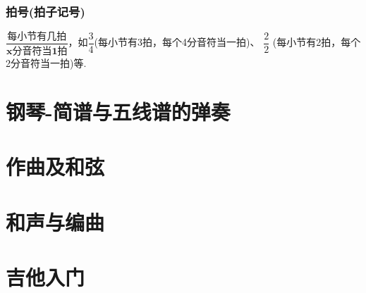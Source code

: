 \documentclass[UTF8,a4paper,12pt]{ctexbook}
\begin{document}
		\subsection*{拍号(拍子记号)}
			$\dfrac{\textbf{每小节有几拍}}{\textbf{x分音符当1拍}} $，如$\dfrac{3}{4} $(每小节有3拍，每个4分音符当一拍)、  $\dfrac{2}{2} $ (每小节有2拍，每个2分音符当一拍)等.
			

\chapter{钢琴-简谱与五线谱的弹奏}

\chapter{作曲及和弦}

\chapter{和声与编曲}

\chapter{吉他入门}
		    
\end{document}
